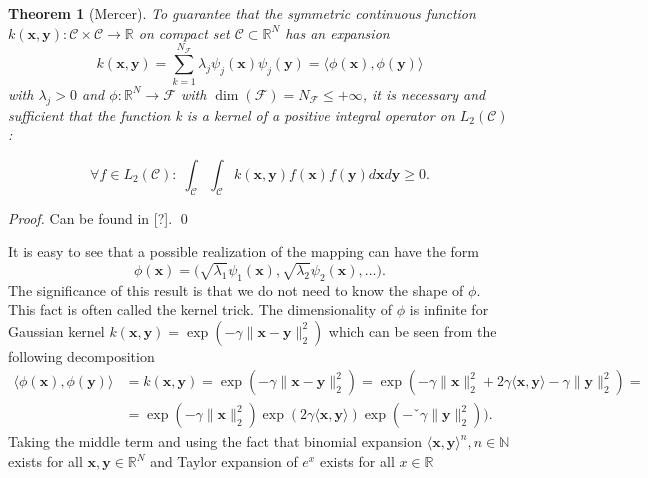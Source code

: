 \documentclass[11pt,oneside,czech,american]{book} %
\theoremstyle{plain}
\newtheorem{thm}{Theorem}
\theoremstyle{definition}
\begin{document}
\begin{thm}[Mercer]
	To guarantee that the symmetric continuous function $k(\bm{x}, \bm{y}): \mathcal{C} \times \mathcal{C} \rightarrow \mathbb{R}$ on compact set $\mathcal{C} \subset \mathbb{R}^N$ has an expansion
	\begin{equation}
		k(\bm{x}, \bm{y}) = \sum_{k=1}^{N_{\mathcal{F}}} \lambda_j \psi_j(\bm{x}) \psi_j(\bm{y}) = \langle \phi(\bm{x}), \phi(\bm{y}) \rangle
	\end{equation}
	with $\lambda_j >0$ and $\phi: \mathbb{R}^N \rightarrow \mathcal{F}$ with $\dim(\mathcal{F}) = N_{\mathcal{F}} \leq + \infty$, it is necessary and sufficient that  the function k is a kernel of a positive integral operator on $L_2 (\mathcal{C})$:
	
	\begin{equation}
		\forall f \in L_2 (\mathcal{C}): \; \int_{\mathcal{C}} \int_{\mathcal{C}} k(\bm{x}, \bm{y}) f(\bm{x}) f(\bm{y}) d\bm{x} d\bm{y} \geq 0.
	\end{equation}
\end{thm}

\emph{Proof.} Can be found in [?]. \qed


It is easy to see that a possible realization of the mapping can have the form $$\phi(\bm{x}) = \Big(\sqrt{\lambda_1}\psi_1(\bm{x}), \sqrt{\lambda_2}\psi_2(\bm{x}), \dots \Big).$$
The significance of this result is that we do not need to know the shape of $\phi$. This fact is often called the kernel trick. The dimensionality of $\phi$ is infinite for Gaussian kernel $k(\bm{x}, \bm{y}) = \exp(- \gamma\| \bm{x} - \bm{y} \|^2_2)$ which can be seen from the following decomposition
\begin{equation}
	\begin{aligned}
		\langle \phi(\bm{x}), \phi(\bm{y}) \rangle &= k(\bm{x}, \bm{y}) = \exp(- \gamma\| \bm{x} - \bm{y} \|^2_2)=\exp(-\gamma \|\bm{x} \|^2_2 + 2\gamma \langle \bm{x}, \bm{y} \rangle - \gamma \|\bm{y} \|^2_2) = \\ &= \exp(-\gamma \|\bm{x} \|^2_2)\exp(2\gamma \langle \bm{x}, \bm{y} \rangle )\exp(-ˇ\gamma \|\bm{y} \|^2_2) ).
	\end{aligned}
\end{equation}
Taking the middle term and using the fact that binomial expansion $\langle \bm{x}, \bm{y}\rangle^n, n \in \mathbb{N}$ exists for all $\bm{x}, \bm{y} \in \mathbb{R}^N$ and Taylor expansion of $e^x$ exists for all $x \in \mathbb{R}$
\end{document}
